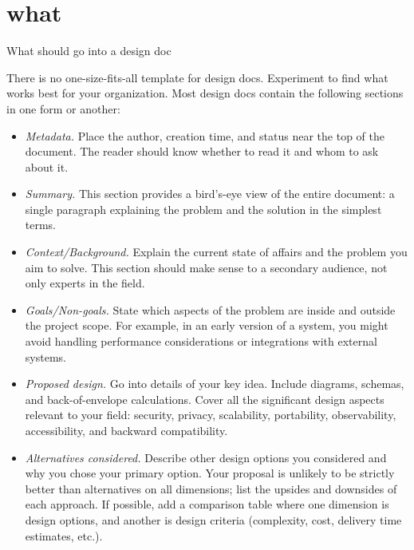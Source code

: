 \documentclass{article}
\begin{document}
\section{what}{What should go into a design doc}

There is no one-size-fits-all template for design docs.
Experiment to find what works best for your organization.
Most design docs contain the following sections in one form or another:
\begin{itemize}
\item \emph{Metadata.}
  Place the author, creation time, and status near the top of the document.
  The reader should know whether to read it and whom to ask about it.
\item \emph{Summary.}
  This section provides a bird's-eye view of the entire document: a single paragraph explaining the problem and the solution in the simplest terms.
\item \emph{Context/Background.}
  Explain the current state of affairs and the problem you aim to solve.
  This section should make sense to a secondary audience, not only experts in the field.
\item \emph{Goals/Non-goals.}
  State which aspects of the problem are inside and outside the project scope.
  For example, in an early version of a system, you might avoid handling performance considerations or integrations with external systems.
\item \emph{Proposed design.}
  Go into details of your key idea.
  Include diagrams, schemas, and back-of-envelope calculations.
  Cover all the significant design aspects relevant to your field: security, privacy, scalability, portability, observability, accessibility, and backward compatibility.
\item \emph{Alternatives considered.}
  Describe other design options you considered and why you chose your primary option.
  Your proposal is unlikely to be strictly better than alternatives on all dimensions; list the upsides and downsides of each approach.
  If possible, add a comparison table where one dimension is design options, and another is design criteria (complexity, cost, delivery time estimates, etc.).
\end{itemize}
\end{document}
